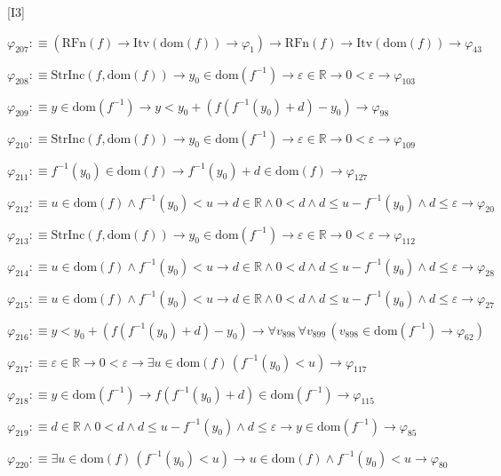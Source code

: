 \begin{fullproof}{[I3]}
\begin{abbrevlist}
\item $\varphi_{207} :\equiv (\mathrm{RFn}(f) \to \mathrm{Itv}(\mathrm{dom}(f)) \to \varphi_{1}) \to \mathrm{RFn}(f) \to \mathrm{Itv}(\mathrm{dom}(f)) \to \varphi_{43}$
\item $\varphi_{208} :\equiv \mathrm{StrInc}(f,\mathrm{dom}(f)) \to y_{0} \in \mathrm{dom}(f^{-1}) \to \varepsilon \in \mathbb{R} \to 0 < \varepsilon \to \varphi_{103}$
\item $\varphi_{209} :\equiv y \in \mathrm{dom}(f^{-1}) \to y < y_{0} + (f(f^{-1}(y_{0}) + d) - y_{0}) \to \varphi_{98}$
\item $\varphi_{210} :\equiv \mathrm{StrInc}(f,\mathrm{dom}(f)) \to y_{0} \in \mathrm{dom}(f^{-1}) \to \varepsilon \in \mathbb{R} \to 0 < \varepsilon \to \varphi_{109}$
\item $\varphi_{211} :\equiv f^{-1}(y_{0}) \in \mathrm{dom}(f) \to f^{-1}(y_{0}) + d \in \mathrm{dom}(f) \to \varphi_{127}$
\item $\varphi_{212} :\equiv u \in \mathrm{dom}(f) \land f^{-1}(y_{0}) < u \to d \in \mathbb{R} \land 0 < d \land d \leq u - f^{-1}(y_{0}) \land d \leq \varepsilon \to \varphi_{20}$
\item $\varphi_{213} :\equiv \mathrm{StrInc}(f,\mathrm{dom}(f)) \to y_{0} \in \mathrm{dom}(f^{-1}) \to \varepsilon \in \mathbb{R} \to 0 < \varepsilon \to \varphi_{112}$
\item $\varphi_{214} :\equiv u \in \mathrm{dom}(f) \land f^{-1}(y_{0}) < u \to d \in \mathbb{R} \land 0 < d \land d \leq u - f^{-1}(y_{0}) \land d \leq \varepsilon \to \varphi_{28}$
\item $\varphi_{215} :\equiv u \in \mathrm{dom}(f) \land f^{-1}(y_{0}) < u \to d \in \mathbb{R} \land 0 < d \land d \leq u - f^{-1}(y_{0}) \land d \leq \varepsilon \to \varphi_{27}$
\item $\varphi_{216} :\equiv y < y_{0} + (f(f^{-1}(y_{0}) + d) - y_{0}) \to \forall v_{898}\,\forall v_{899}\,(v_{898} \in \mathrm{dom}(f^{-1}) \to \varphi_{62})$
\item $\varphi_{217} :\equiv \varepsilon \in \mathbb{R} \to 0 < \varepsilon \to \exists u \in \mathrm{dom}(f)\,(f^{-1}(y_{0}) < u) \to \varphi_{117}$
\item $\varphi_{218} :\equiv y \in \mathrm{dom}(f^{-1}) \to f(f^{-1}(y_{0}) + d) \in \mathrm{dom}(f^{-1}) \to \varphi_{115}$
\item $\varphi_{219} :\equiv d \in \mathbb{R} \land 0 < d \land d \leq u - f^{-1}(y_{0}) \land d \leq \varepsilon \to y \in \mathrm{dom}(f^{-1}) \to \varphi_{85}$
\item $\varphi_{220} :\equiv \exists u \in \mathrm{dom}(f)\,(f^{-1}(y_{0}) < u) \to u \in \mathrm{dom}(f) \land f^{-1}(y_{0}) < u \to \varphi_{80}$

\end{abbrevlist}
\end{fullproof}
